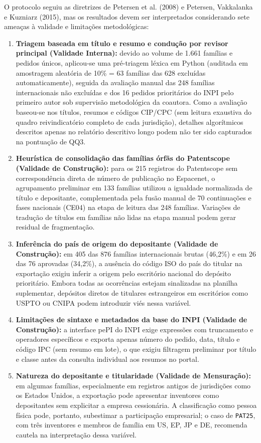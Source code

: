 \documentclass[12pt,a4paper]{article}
\begin{document}
O protocolo seguiu as diretrizes de Petersen et al. (2008) e Petersen, Vakkalanka e Kuzniarz (2015), mas os resultados devem ser interpretados considerando sete ameaças à validade e limitações metodológicas:
\begin{enumerate}
    \item \textbf{Triagem baseada em título e resumo e condução por revisor principal (Validade Interna):} devido ao volume de 1.661 famílias e pedidos únicos, aplicou-se uma pré-triagem léxica em Python (auditada em amostragem aleatória de 10\% = 63 famílias das 628 excluídas automaticamente), seguida da avaliação manual das 248 famílias internacionais não excluídas e dos 16 pedidos prioritários do INPI pelo primeiro autor sob supervisão metodológica da coautora. Como a avaliação baseou-se nos títulos, resumos e códigos CIP/CPC (sem leitura exaustiva do quadro reivindicatório completo de cada jurisdição), detalhes algorítmicos descritos apenas no relatório descritivo longo podem não ter sido capturados na pontuação de QQ3.
    \item \textbf{Heurística de consolidação das famílias órfãs do Patentscope (Validade de Construção):} para os 215 registros do Patentscope sem correspondência direta de número de publicação no Espacenet, o agrupamento preliminar em 133 famílias utilizou a igualdade normalizada de título e depositante, complementada pela fusão manual de 70 continuações e fases nacionais (CE04) na etapa de leitura das 248 famílias. Variações de tradução de títulos em famílias não lidas na etapa manual podem gerar residual de fragmentação.
    \item \textbf{Inferência do país de origem do depositante (Validade de Construção):} em 405 das 876 famílias internacionais brutas (46,2\%) e em 26 das 76 aprovadas (34,2\%), a ausência do código ISO do país do titular na exportação exigiu inferir a origem pelo escritório nacional do depósito prioritário. Embora todas as ocorrências estejam sinalizadas na planilha suplementar, depósitos diretos de titulares estrangeiros em escritórios como USPTO ou CNIPA podem introduzir viés nessa variável.
    \item \textbf{Limitações de sintaxe e metadados da base do INPI (Validade de Construção):} a interface pePI do INPI exige expressões com truncamento e operadores específicos e exporta apenas número do pedido, data, título e código IPC (sem resumo em lote), o que exigiu filtragem preliminar por título e classe antes da consulta individual aos resumos no portal.
    \item \textbf{Natureza do depositante e titularidade (Validade de Mensuração):} em algumas famílias, especialmente em registros antigos de jurisdições como os Estados Unidos, a exportação pode apresentar inventores como depositantes sem explicitar a empresa cessionária. A classificação como pessoa física pode, portanto, subestimar a participação empresarial; o caso de \texttt{PAT25}, com três inventores e membros de família em US, EP, JP e DE, recomenda cautela na interpretação dessa variável.

\end{enumerate}
\end{document}
